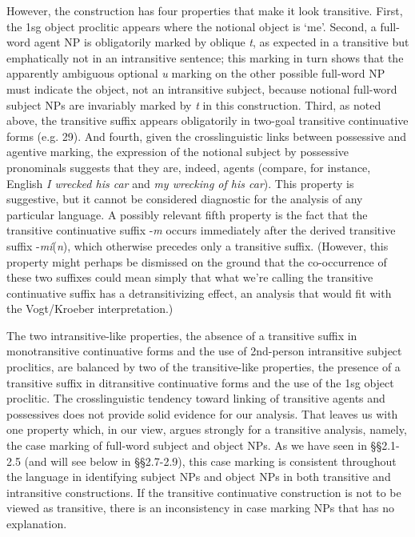 \documentclass[output=paper,colorlinks,citecolor=brown]{langscibook}
\begin{document}
However, the construction has four properties that make it look
transitive.  First, the 1sg object proclitic appears where the
notional object is `me'.  Second, a full-word agent NP is obligatorily
marked by oblique \emph{t}, as expected in a transitive but
emphatically not in an intransitive sentence; this marking in turn
shows that the apparently ambiguous optional \emph{{\textltilde}u}
marking on the other possible full-word NP must indicate the object,
not an intransitive subject, because notional full-word subject NPs
are invariably marked by \emph{t} in this construction.  Third, as
noted above, the transitive suffix appears obligatorily in two-goal
transitive continuative forms (e.g. 29).  And fourth, given the
crosslinguistic links between possessive and agentive marking, the
expression of the notional subject by possessive pronominals suggests
that they are, indeed, agents (compare, for instance, English \emph{I
wrecked his car} and \emph{my wrecking of his car}).  This property is
suggestive, but it cannot be considered diagnostic for the analysis of
any particular language.  A possibly relevant fifth property is the
fact that the transitive continuative suffix -\emph{m} occurs
immediately after the derived transitive suffix
-\emph{m\'i}(\emph{n}), which otherwise precedes only a transitive
suffix.  (However, this property might perhaps be dismissed on the
ground that the co-occurrence of these two suffixes could mean simply
that what we're calling the transitive continuative suffix has a
detransitivizing effect, an analysis that would fit with the
Vogt/Kroeber interpretation.)


The two intransitive-like properties, the absence of a transitive
suffix in monotransitive continuative forms and the use of 2nd-person
intransitive subject proclitics, are balanced by two of the
transitive-like properties, the presence of a transitive suffix in
ditransitive continuative forms and the use of the 1sg object
proclitic.  The crosslinguistic tendency toward linking of transitive
agents and possessives does not provide solid evidence for our
analysis.  That leaves us with one property which, in our view, argues
strongly for a transitive analysis, namely, the case marking of
full-word subject and object NPs.  As we have seen in \S\S 2.1-2.5 (and
will see below in \S\S 2.7-2.9), this case marking is consistent
throughout the language in identifying subject NPs and object NPs in
both transitive and intransitive constructions.  If the transitive
continuative construction is not to be viewed as transitive, there is
an inconsistency in case marking NPs that has no explanation.
\end{document}
